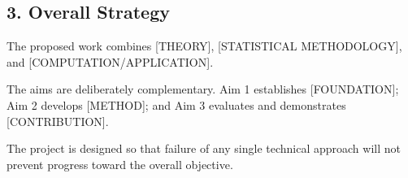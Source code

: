 \documentclass[
  11pt,
  letterpaper,
]{article}
\begin{document}
\subsection{3. Overall Strategy}\label{overall-strategy}

The proposed work combines {[}THEORY{]}, {[}STATISTICAL METHODOLOGY{]},
and {[}COMPUTATION/APPLICATION{]}.

The aims are deliberately complementary. Aim 1 establishes
{[}FOUNDATION{]}; Aim 2 develops {[}METHOD{]}; and Aim 3 evaluates and
demonstrates {[}CONTRIBUTION{]}.

The project is designed so that failure of any single technical approach
will not prevent progress toward the overall objective.


  
\end{document}
